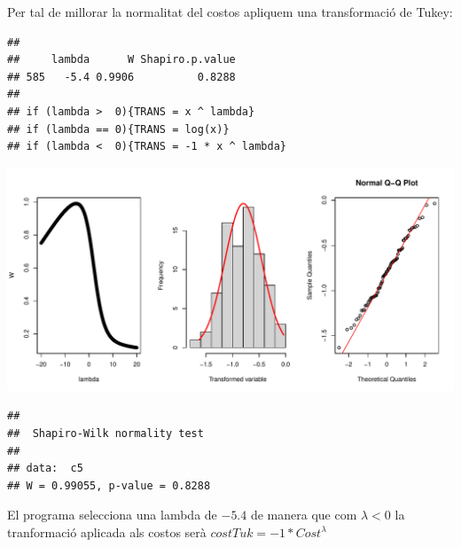 \documentclass[11pt,a4paper]{article}\usepackage[]{graphicx}\usepackage[]{color}
\makeatletter
\def\maxwidth{ %
  \ifdim\Gin@nat@width>\linewidth
    \linewidth
  \else
    \Gin@nat@width
  \fi
}
\newenvironment{kframe}{%
 \def\at@end@of@kframe{}%
 \ifinner\ifhmode%
  \def\at@end@of@kframe{\end{minipage}}%
  \begin{minipage}{\columnwidth}%
 \fi\fi%
 \def\FrameCommand##1{\hskip\@totalleftmargin \hskip-\fboxsep
 \colorbox{shadecolor}{##1}\hskip-\fboxsep
     \hskip-\linewidth \hskip-\@totalleftmargin \hskip\columnwidth}%
 \MakeFramed {\advance\hsize-\width
   \@totalleftmargin\z@ \linewidth\hsize
   \@setminipage}}%
 {\par\unskip\endMakeFramed%
 \at@end@of@kframe}
\newenvironment{knitrout}{}{} %
\makeatother
\begin{document}
Per tal de millorar la normalitat del costos apliquem una transformació de Tukey:
\begin{knitrout}
\color{fgcolor}\begin{kframe}
\begin{verbatim}
## 
##     lambda      W Shapiro.p.value
## 585   -5.4 0.9906          0.8288
## 
## if (lambda >  0){TRANS = x ^ lambda} 
## if (lambda == 0){TRANS = log(x)} 
## if (lambda <  0){TRANS = -1 * x ^ lambda}
\end{verbatim}
\end{kframe}
\includegraphics[width=\maxwidth]{figure/unnamed-chunk-17-1} 
\begin{kframe}

{\ttfamily\noindent\bfseries{}}\begin{verbatim}
## 
## 	Shapiro-Wilk normality test
## 
## data:  c5
## W = 0.99055, p-value = 0.8288
\end{verbatim}
\end{kframe}
\end{knitrout}

El programa selecciona una lambda de $-5.4$ de manera que com $\lambda < 0$ la tranformació aplicada als costos serà $costTuk = -1 * Cost^{\lambda}$
\end{document}
